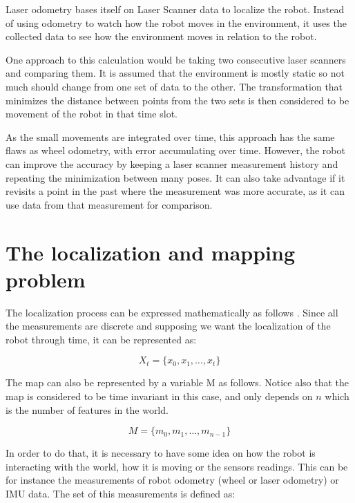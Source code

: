 Laser odometry bases itself on Laser Scanner data to localize the robot. Instead of using odometry to watch how the robot moves in the environment, it uses the collected data to see how the environment moves in relation to the robot.

One approach to this calculation would be taking two consecutive laser scanners and comparing them. It is assumed that the environment is mostly static so not much should change from one set of data to the other. The transformation that minimizes the distance between points from the two sets is then considered to be movement of the robot in that time slot.

As the small movements are integrated over time, this approach has the same flaws as wheel odometry, with error accumulating over time. However, the robot can improve the accuracy by keeping a laser scanner measurement history and repeating the minimization between many poses. It can also take advantage if it revisits a point in the past where the measurement was more accurate, as it can use data from that measurement for comparison.

\section{The localization and mapping problem}

The localization process can be expressed mathematically as follows \cite{thrun2005probabilistic}. Since all the measurements are discrete and supposing we want the localization of the robot through time, it can be represented as:

\begin{equation}\label{eq:x}
    X_t = \{x_0, x_1, \dots, x_t\} 
\end{equation}

The map can also be represented by a variable M as follows. Notice also that the map is considered to be time invariant in this case, and only depends on $n$ which is the number of features in the world.

\begin{equation}
    M = \{m_0, m_1, \dots, m_{n - 1}\}
\end{equation}

In order to do that, it is necessary to have some idea on how the robot is interacting with the world, how it is moving or the sensors readings. This can be for instance the measurements of robot odometry (wheel or laser odometry) or IMU data. The set of this measurements is defined as:

